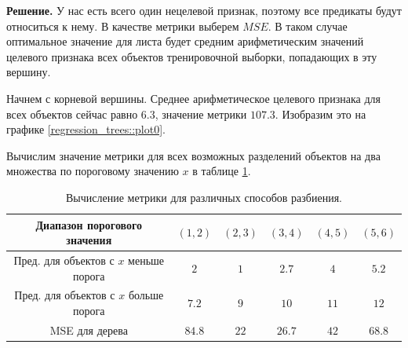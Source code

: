 \textbf{Решение.}
У нас есть всего один нецелевой признак, поэтому все предикаты будут относиться к нему. В качестве метрики выберем $MSE$. В таком случае оптимальное значение для листа будет средним арифметическим значений целевого признака всех объектов тренировочной выборки, попадающих в эту вершину.

Начнем с корневой вершины. Среднее арифметическое целевого признака для всех объектов сейчас равно $6.3$, значение метрики $107.3$. Изобразим это на графике \ref{regression_trees::plot0}. 

\begin{center}
\end{center}

Вычислим значение метрики для всех возможных разделений объектов на два множества по пороговому значению $x$ в таблице \ref{regression_trees::table1}.
\begin{table}[h]
    \centering
    \caption{Вычисление метрики для различных способов разбиения.}
    \begin{tabular}{|c|c|c|c|c|c|}
        \hline
        Диапазон порогового значения           & $(1, 2)$ & $(2, 3)$ & $(3, 4)$ & $(4, 5)$ & $(5, 6)$ \\
        \hline
        Пред. для объектов с $x$ меньше порога & $2$      & $1$      & $2.7$    & $4$      & $5.2$    \\
        \hline
        Пред. для объектов с $x$ больше порога & $7.2$    & $9$      & $10$     & $11$     & $12$     \\
        \hline
        MSE для дерева                         & $84.8$   & $22$     & $26.7$   & $42$     & $68.8$   \\
        \hline
    \end{tabular} \label{regression_trees::table1}
\end{table}

